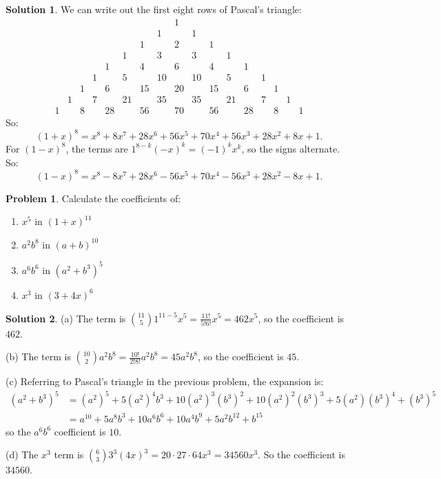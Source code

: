 \documentclass{article}
\numberwithin{equation}{section}
\theoremstyle{plain}
\theoremstyle{definition}
\newtheorem{problem}{Problem}
\newtheorem*{solution*}{Solution}
\begin{document}
\begin{solution*}
	We can write out the first eight rows of Pascal's triangle: 
	\[
	\begin{array}{ccccccccccccccccc}
	& & & & & & & & 1 & & & & & & & & \\
	& & & & & & & 1 & & 1 & & & & & & & \\
	& & & & & & 1 & & 2 & & 1 & & & & & &\\
	& & & & & 1 & & 3 & & 3 & & 1 & & & & &\\
	& & & & 1 & & 4 & & 6 & & 4 & & 1 & & & &\\
	& & & 1 & & 5 & & 10 & & 10 & & 5 & & 1 & & &\\
	& & 1 & & 6 & & 15 & & 20 & & 15 & & 6 & & 1 & &\\
	& 1 & & 7 & & 21 & & 35 & & 35 & & 21 & & 7 & & 1 &\\
	1 & & 8 & & 28 & & 56 & & 70 & & 56 & & 28 & & 8 & & 1
	\end{array}
	\]
	So:
	\[
	\boxed{(1+x)^8 = x^8 + 8x^7 + 28x^6 + 56x^5 + 70x^4 + 56x^3 + 28x^2 + 8x + 1}.
	\]
	For $(1-x)^8$, the terms are $1^{8-k}(-x)^{k} = (-1)^k x^k$, so the signs alternate. So: 
	\[
	\boxed{(1-x)^8 = x^8 - 8x^7 + 28x^6 - 56x^5 + 70x^4 - 56x^3 + 28x^2 - 8x + 1}.
	\]
\end{solution*}

\begin{problem}
	Calculate the coefficients of: 
	\begin{enumerate}[label=(\alph*)]
		\item $x^5$ in $(1+x)^{11}$
		\item $a^2b^8$ in $(a+b)^{10}$
		\item $a^6 b^6$ in $(a^2 + b^3)^5$
		\item $x^3$ in $(3+4x)^6$
	\end{enumerate}
\end{problem}

\begin{solution*}
	(a) The term is $\displaystyle \binom{11}5 1^{11-5} x^5 = \frac{11!}{5!6!} x^5 = 462 x^5$, so the coefficient is $\boxed{462}$. 
	
	(b) The term is $\displaystyle \binom{10}2 a^2 b^8 = \frac{10!}{2! 8!} a^2 b^8 = 45a^2 b^8$, so the coefficient is $\boxed{45}$. 
	
	(c) Referring to Pascal's triangle in the previous problem, the expansion is:
	\begin{align*}
	(a^2 + b^3)^5 &= (a^2)^5 + 5(a^2)^4 b^3 + 10(a^2)^3 (b^3)^2 + 10(a^2)^2 (b^3)^3 + 5(a^2)(b^3)^4 + (b^3)^5 \\
	&= a^{10} + 5a^8 b^3 + 10a^6 b^6 + 10a^4 b^9 + 5a^2 b^{12} + b^{15}
	\end{align*}
	so the $a^6 b^6$ coefficient is $\boxed{10}$. 
	
	(d) The $x^3$ term is $\displaystyle \binom{6}{3} 3^3(4x)^3 = 20 \cdot 27 \cdot 64 x^3 = 34560x^3$. So the coefficient is $\boxed{34560}$. 
\end{solution*}
\end{document}
